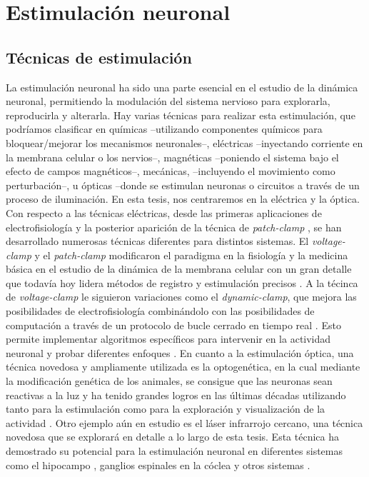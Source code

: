 \section{Estimulación neuronal}
\subsection{Técnicas de estimulación}

La estimulación neuronal ha sido una parte esencial en el estudio de la dinámica neuronal, permitiendo la modulación del sistema nervioso para explorarla, reproducirla y alterarla. Hay varias técnicas para realizar esta estimulación, que podríamos clasificar en químicas --utilizando componentes químicos para bloquear/mejorar los mecanismos neuronales--, eléctricas --inyectando corriente en la membrana celular o los nervios--, magnéticas --poniendo el sistema bajo el efecto de campos magnéticos--, mecánicas, --incluyendo el movimiento como perturbación--, u ópticas --donde se estimulan neuronas o circuitos a través de un proceso de iluminación. En esta tesis, nos centraremos en la eléctrica y la óptica. Con respecto a las técnicas eléctricas, desde las primeras aplicaciones de electrofisiología \parencite{marmont_studies_1949,cole_ions_1955,neher_singlechannel_1976} y la posterior aparición de la técnica de \textit{patch-clamp} \textcite{hamill_improved_1981}, se han desarrollado numerosas técnicas diferentes para distintos sistemas. El \textit{voltage-clamp} y el \textit{patch-clamp} modificaron el paradigma en la fisiología y la medicina básica en el estudio de la dinámica de la membrana celular con un gran detalle que todavía hoy lidera métodos de registro y estimulación precisos \parencite{hamill_improved_1981}. A la técinca de \textit{voltage-clamp} le siguieron variaciones como el \textit{dynamic-clamp}, que mejora las posibilidades de electrofisiología combinándolo con las posibilidades de computación a través de un protocolo de bucle cerrado en tiempo real \parencite{nowotny_dynamic_2022}. Esto permite implementar algoritmos específicos para intervenir en la actividad neuronal y probar diferentes enfoques \parencite{chamorro_generalization_2012}. En cuanto a la estimulación óptica, una técnica novedosa y ampliamente utilizada es la optogenética, en la cual mediante la modificación genética de los animales, se consigue que las neuronas sean reactivas a la luz y ha tenido grandes logros en las últimas décadas utilizando tanto para la estimulación como para la exploración y visualización de la actividad \parencite{chen_roles_2022}. Otro ejemplo aún en estudio es el láser infrarrojo cercano, una técnica novedosa que se explorará en detalle a lo largo de esta tesis. Esta técnica ha demostrado su potencial para la estimulación neuronal en diferentes sistemas como el hipocampo \parencite{liang_temperaturedependent_2009}, ganglios espinales en la cóclea \parencite{goyal_acute_2012, barrett_pulsed_2018, brown_thermal_2020} y otros sistemas \parencite{shapiro_infrared_2012, cayce_infrared_2014, begeng_activity_2022}.

